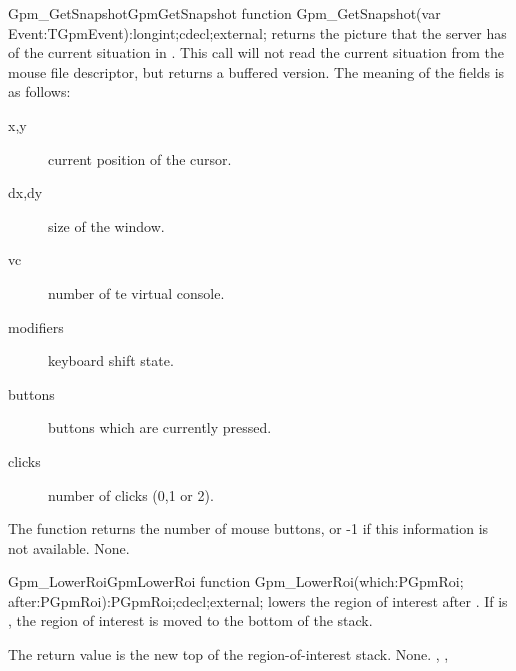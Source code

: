 \begin{functionl}{Gpm\_GetSnapshot}{GpmGetSnapshot}
\Declaration
function Gpm\_GetSnapshot(var Event:TGpmEvent):longint;cdecl;external;
\Description
{} returns the picture that the server has of the 
current situation in . 
This call will not read the current situation from the mouse file
descriptor, but returns a buffered version.
The meaning of the fields is as follows:
\begin{description}
\item[x,y] current position of the cursor.
\item[dx,dy] size of the window.
\item[vc] number of te virtual console.
\item[modifiers] keyboard shift state.
\item[buttons] buttons which are currently pressed.
\item[clicks] number of clicks (0,1 or 2).
\end{description}
The function returns the number of mouse buttons, or -1 if this information
is not available.
\Errors
None.
\SeeAlso
{}
\end{functionl}

\begin{functionl}{Gpm\_LowerRoi}{GpmLowerRoi}
\Declaration
function Gpm\_LowerRoi(which:PGpmRoi; after:PGpmRoi):PGpmRoi;cdecl;external;
\Description
{} lowers the region of interest  after
. If  is , the region of interest is moved to
the bottom of the stack.

The return value is the new top of the region-of-interest stack.
\Errors
None.
\SeeAlso
{},
,
\end{functionl}

